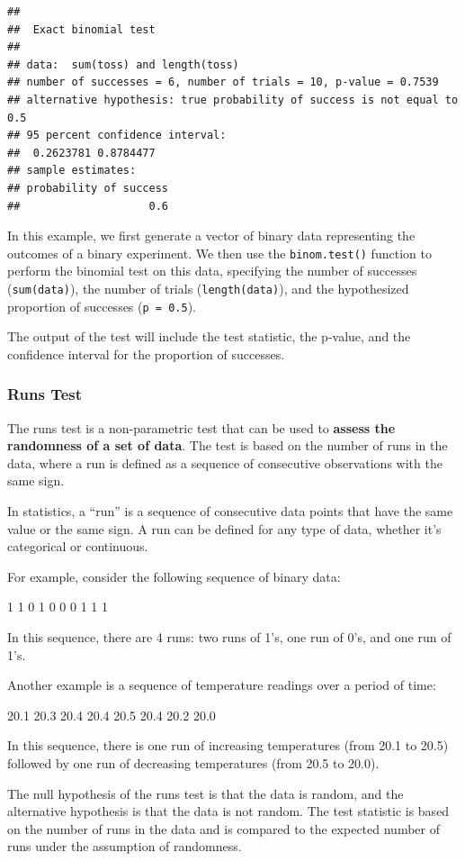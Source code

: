\documentclass[
]{ctexart}
\begin{document}
\begin{verbatim}
## 
##  Exact binomial test
## 
## data:  sum(toss) and length(toss)
## number of successes = 6, number of trials = 10, p-value = 0.7539
## alternative hypothesis: true probability of success is not equal to 0.5
## 95 percent confidence interval:
##  0.2623781 0.8784477
## sample estimates:
## probability of success 
##                    0.6
\end{verbatim}

In this example, we first generate a vector of binary data representing
the outcomes of a binary experiment. We then use the
\texttt{binom.test()} function to perform the binomial test on this
data, specifying the number of successes (\texttt{sum(data)}), the
number of trials (\texttt{length(data)}), and the hypothesized
proportion of successes (\texttt{p\ =\ 0.5}).

The output of the test will include the test statistic, the p-value, and
the confidence interval for the proportion of successes.

\hypertarget{runs-test}{%
\subsubsection{Runs Test}\label{runs-test}}

The runs test is a non-parametric test that can be used to
\textbf{assess the randomness of a set of data}. The test is based on
the number of runs in the data, where a run is defined as a sequence of
consecutive observations with the same sign.

In statistics, a ``run'' is a sequence of consecutive data points that
have the same value or the same sign. A run can be defined for any type
of data, whether it's categorical or continuous.

For example, consider the following sequence of binary data:

1 1 0 1 0 0 0 1 1 1

In this sequence, there are 4 runs: two runs of 1's, one run of 0's, and
one run of 1's.

Another example is a sequence of temperature readings over a period of
time:

20.1 20.3 20.4 20.4 20.5 20.4 20.2 20.0

In this sequence, there is one run of increasing temperatures (from 20.1
to 20.5) followed by one run of decreasing temperatures (from 20.5 to
20.0).

The null hypothesis of the runs test is that the data is random, and the
alternative hypothesis is that the data is not random. The test
statistic is based on the number of runs in the data and is compared to
the expected number of runs under the assumption of randomness.
\end{document}
